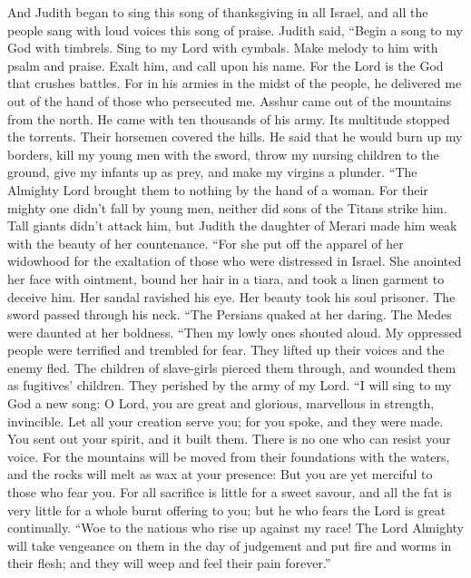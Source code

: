  And Judith began to sing this song of thanksgiving in all
Israel, and all the people sang with loud voices this song of praise.
 Judith said, ``Begin a song to my God with timbrels. Sing
to my Lord with cymbals. Make melody to him with psalm and praise. Exalt
him, and call upon his name.  For the Lord is the God that
crushes battles. For in his armies in the midst of the people, he
delivered me out of the hand of those who persecuted me. 
Asshur came out of the mountains from the north. He came with ten
thousands of his army. Its multitude stopped the torrents. Their
horsemen covered the hills.  He said that he would burn up
my borders, kill my young men with the sword, throw my nursing children
to the ground, give my infants up as prey, and make my virgins a
plunder.  ``The Almighty Lord brought them to nothing by the
hand of a woman.  For their mighty one didn't fall by young
men, neither did sons of the Titans strike him. Tall giants didn't
attack him, but Judith the daughter of Merari made him weak with the
beauty of her countenance.  ``For she put off the apparel of
her widowhood for the exaltation of those who were distressed in Israel.
She anointed her face with ointment, bound her hair in a tiara, and took
a linen garment to deceive him.  Her sandal ravished his
eye. Her beauty took his soul prisoner. The sword passed through his
neck.  ``The Persians quaked at her daring. The Medes were
daunted at her boldness.  ``Then my lowly ones shouted
aloud. My oppressed people were terrified and trembled for fear. They
lifted up their voices and the enemy fled.  The children of
slave-girls pierced them through, and wounded them as fugitives'
children. They perished by the army of my Lord.  ``I will
sing to my God a new song: O Lord, you are great and glorious,
marvellous in strength, invincible.  Let all your creation
serve you; for you spoke, and they were made. You sent out your spirit,
and it built them. There is no one who can resist your voice.
 For the mountains will be moved from their foundations
with the waters, and the rocks will melt as wax at your presence: But
you are yet merciful to those who fear you.  For all
sacrifice is little for a sweet savour, and all the fat is very little
for a whole burnt offering to you; but he who fears the Lord is great
continually.  ``Woe to the nations who rise up against my
race! The Lord Almighty will take vengeance on them in the day of
judgement and put fire and worms in their flesh; and they will weep and
feel their pain forever.''

